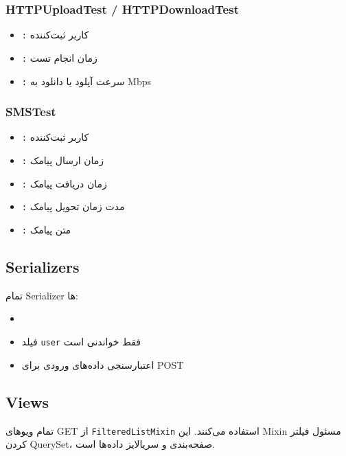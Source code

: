 \documentclass{report}
\begin{document}
\subsubsection{HTTPUploadTest / HTTPDownloadTest}
\begin{itemize}
    \item \texttt{:} کاربر ثبت‌کننده
    \item \texttt{:} زمان انجام تست
    \item \texttt{:} سرعت آپلود یا دانلود به Mbps
\end{itemize}

\subsubsection{SMSTest}
\begin{itemize}
    \item \texttt{:} کاربر ثبت‌کننده
    \item \texttt{:} زمان ارسال پیامک
    \item \texttt{:} زمان دریافت پیامک
    \item \texttt{:} مدت زمان تحویل پیامک  
    \item \texttt{:} متن پیامک
\end{itemize}

\subsection{Serializers}
تمام  Serializer ها:
\begin{itemize}
    \item \texttt{}
\end{itemize}

\begin{itemize}
    \item فیلد \texttt{user} فقط خواندنی است
    \item اعتبارسنجی داده‌های ورودی برای POST
\end{itemize}

\subsection{Views}
تمام ویوهای GET از \texttt{FilteredListMixin} استفاده می‌کنند.
این Mixin مسئول فیلتر کردن QuerySet، صفحه‌بندی و سریالایز داده‌ها است.
\end{document}
